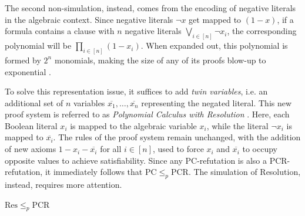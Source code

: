 The second non-simulation, instead, comes from the encoding of negative literals in the algebraic context. Since negative literals $\lnot x$ get mapped to $(1-x)$, if a formula contains a clause with $n$ negative literals $\bigvee_{i \in [n]} \lnot x_i$, the corresponding polynomial will be $\prod_{i \in [n]} (1-x_i)$. When expanded out, this polynomial is formed by $2^n$ monomials, making the size of any of its proofs blow-up to exponential \cite{gaps}.

To solve this representation issue, it suffices to add \textit{twin variables}, i.e. an additional set of $n$ variables $\overline{x_1}, \ldots, \overline{x_n}$ representing the negated literal. This new proof system is referred to as \textit{Polynomial Calculus with Resolution} \cite{pcr}. Here, each Boolean literal $x_i$ is mapped to the algebraic variable $x_i$, while the literal $\lnot x_i$ is mapped to $\overline{x_i}$. The rules of the proof system remain unchanged, with the addition of new axioms $1 - x_i - \overline{x_i}$ for all $i \in [n]$, used to force $x_i$ and $\overline{x_i}$ to occupy opposite values to achieve satisfiability. Since any PC-refutation is also a PCR-refutation, it immediately follows that $\mathrm{PC} \leq_p \mathrm{PCR}$. The simulation of Resolution, instead, requires more attention.

\begin{proposition}
    $\mathrm{Res} \leq_p \mathrm{PCR}$
\end{proposition}

